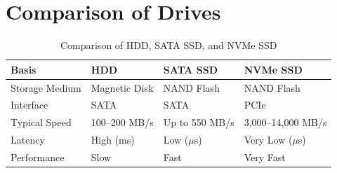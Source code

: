 \section{Comparison of Drives}
\begin{table}[h]
\centering
\renewcommand{\arraystretch}{1.4}
\begin{tabular}{|l|l|l|l|}
\hline
\textbf{Basis} & \textbf{HDD} & \textbf{SATA SSD} & \textbf{NVMe SSD} \\
\hline
Storage Medium & Magnetic Disk & NAND Flash & NAND Flash \\
\hline
Interface & SATA & SATA & PCIe \\
\hline
Typical Speed & 100--200 MB/s & Up to 550 MB/s & 3,000--14,000 MB/s \\
\hline
Latency & High (ms) & Low ($\mu$s) & Very Low ($\mu$s) \\
\hline
Performance & Slow & Fast & Very Fast \\
\hline
\end{tabular}
\caption{Comparison of HDD, SATA SSD, and NVMe SSD}
\label{tab:hdd_ssd_nvme}
\end{table}